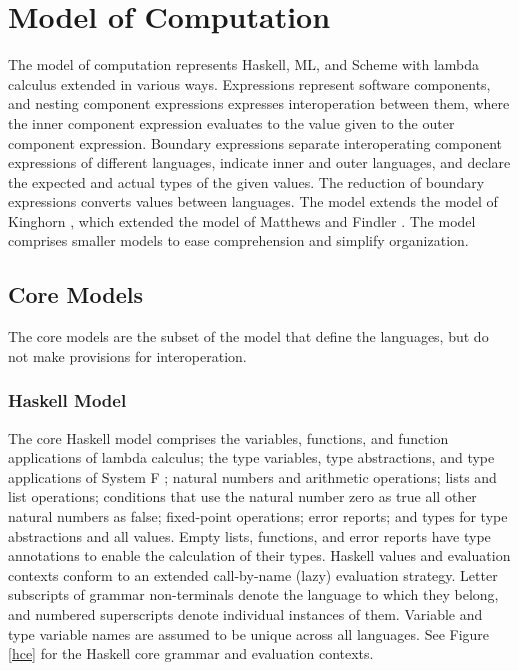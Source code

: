 \chapter{Model of Computation}

The model of computation represents Haskell, ML, and Scheme with lambda calculus extended in various ways.  Expressions represent software components, and nesting component expressions expresses interoperation between them, where the inner component expression evaluates to the value given to the outer component expression.  Boundary expressions separate interoperating component expressions of different languages, indicate inner and outer languages, and declare the expected and actual types of the given values.  The reduction of boundary expressions converts values between languages.  The model extends the model of Kinghorn \cite{kinghorn07}, which extended the model of Matthews and Findler \cite{matthews07}.  The model comprises smaller models to ease comprehension and simplify organization.

\section{Core Models}

The core models are the subset of the model that define the languages, but do not make provisions for interoperation.

\subsection{Haskell Model}

The core Haskell model comprises the variables, functions, and function applications of lambda calculus; the type variables, type abstractions, and type applications of System F \cite{pierce02}; natural numbers and arithmetic operations; lists and list operations; conditions that use the natural number zero as true all other natural numbers as false; fixed-point operations; error reports; and types for type abstractions and all values.  Empty lists, functions, and error reports have type annotations to enable the calculation of their types.  Haskell values and evaluation contexts conform to an extended call-by-name (lazy) evaluation strategy.  Letter subscripts of grammar non-terminals denote the language to which they belong, and numbered superscripts denote individual instances of them.  Variable and type variable names are assumed to be unique across all languages.  See Figure \ref{hce} for the Haskell core grammar and evaluation contexts.


